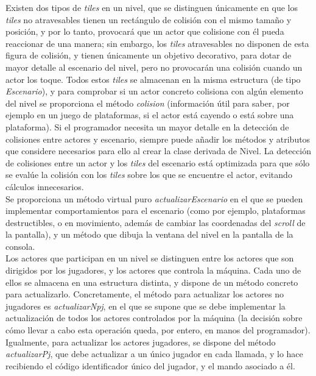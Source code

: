 Existen dos tipos de \emph{tiles} en un nivel, que se distinguen únicamente en que los \emph{tiles} no atravesables tienen un rectángulo de colisión con el mismo tamaño y posición, y por lo tanto, provocará que un actor que colisione con él pueda reaccionar de una manera; sin embargo, los \emph{tiles} atravesables no disponen de esta figura de colisión, y tienen únicamente un objetivo decorativo, para dotar de mayor detalle al escenario del nivel, pero no provocarán una colisión cuando un actor los toque. Todos estos \emph{tiles} se almacenan en la misma estructura (de tipo \emph{Escenario}), y para comprobar si un actor concreto colisiona con algún elemento del nivel se proporciona el método \emph{colision} (información útil para saber, por ejemplo en un juego de plataformas, si el actor está cayendo o está sobre una plataforma). Si el programador necesita un mayor detalle en la detección de colisiones entre actores y escenario, siempre puede añadir los métodos y atributos que considere necesarios para ello al crear la clase derivada de Nivel. La detección de colisiones entre un actor y los \emph{tiles} del escenario está optimizada para que sólo se evalúe la colisión con los \emph{tiles} sobre los que se encuentre el actor, evitando cálculos innecesarios.\\

Se proporciona un método virtual puro \emph{actualizarEscenario} en el que se pueden implementar comportamientos para el escenario (como por ejemplo, plataformas destructibles, o en movimiento, además de cambiar las coordenadas del \emph{scroll} de la pantalla), y un método que dibuja la ventana del nivel en la pantalla de la consola.\\

Los actores que participan en un nivel se distinguen entre los actores que son dirigidos por los jugadores, y los actores que controla la máquina. Cada uno de ellos se almacena en una estructura distinta, y dispone de un método concreto para actualizarlo. Concretamente, el método para actualizar los actores no jugadores es \emph{actualizarNpj}, en el que se supone que se debe implementar la actualización de todos los actores controlados por la máquina (la decisión sobre cómo llevar a cabo esta operación queda, por entero, en manos del programador). Igualmente, para actualizar los actores jugadores, se dispone del método \emph{actualizarPj}, que debe actualizar a un único jugador en cada llamada, y lo hace recibiendo el código identificador único del jugador, y el mando asociado a él.\\

